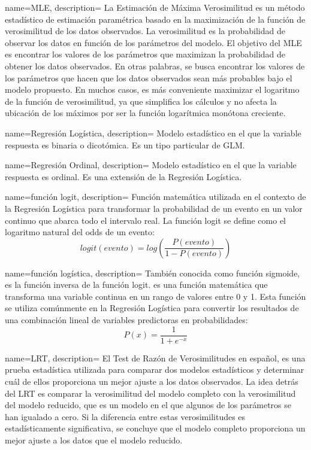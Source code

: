 {
    name=MLE,
    description={
        La Estimación de Máxima Verosimilitud es un método estadístico de estimación paramétrica
        basado en la maximización de la función de verosimilitud de los datos observados.
        La verosimilitud es la probabilidad de observar los datos en función de los parámetros del modelo.
        El objetivo del MLE es encontrar los valores de los parámetros que maximizan
        la probabilidad de obtener los datos observados.
        En otras palabras, se busca encontrar los valores de los parámetros que hacen que los datos observados
        sean más probables bajo el modelo propuesto.
        En muchos casos, es más conveniente maximizar el logaritmo de la función de verosimilitud,
        ya que simplifica los cálculos y no afecta la ubicación de los máximos por ser la función logarítmica
        monótona creciente.        
        }
}


{
    name=Regresión Logística,
    description={
        Modelo estadístico en el que la variable respuesta es binaria o dicotómica. Es un tipo particular de \gls{GLM}.}
}


{
    name=Regresión Ordinal,
    description={
        Modelo estadístico en el que la variable respuesta es ordinal. Es una extensión de la \gls{Regresión Logística}.}
}


{
    name=función logit,
    description={
        Función matemática utilizada en el contexto de la \gls{Regresión Logística} para transformar
        la probabilidad de un evento en un valor continuo que abarca todo el intervalo real.
        La función logit se define como el logaritmo natural del odds de un evento:        
        $$
        logit(evento) = log (\frac{P(evento)}{1-P(evento)})
        $$
    }
}


{
    name=función logística,
    description={
        También conocida como función sigmoide, es la función inversa de la \gls{función logit}.
        es una función matemática que transforma una variable continua en un rango de valores entre 0 y 1.
        Esta función se utiliza comúnmente en la \gls{Regresión Logística} para convertir los resultados de una combinación lineal
        de variables predictoras en probabilidades:
        $$
        P(x) = \frac{1}{1 + e^{-x}}
        $$
    }
}



{
    name=LRT,
    description={
        El Test de Razón de Verosimilitudes en español, es una prueba estadística utilizada
        para comparar dos modelos estadísticos y determinar cuál de ellos proporciona un mejor ajuste
        a los datos observados.
        La idea detrás del LRT es comparar la verosimilitud del modelo completo con la verosimilitud
        del modelo reducido, que es un modelo en el que algunos de los parámetros se han igualado a cero.
        Si la diferencia entre estas verosimilitudes es estadísticamente significativa,
        se concluye que el modelo completo proporciona un mejor ajuste a los datos que el modelo reducido.
    }
}


